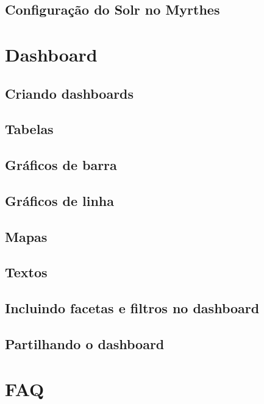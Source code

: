 \documentclass[]{book}
\begin{document}
\hypertarget{configuracao-do-solr-no-myrthes}{%
\section{Configuração do Solr no Myrthes}\label{configuracao-do-solr-no-myrthes}}

\hypertarget{dashbord}{%
\chapter{Dashboard}\label{dashbord}}

\hypertarget{criando-dashboards}{%
\section{Criando dashboards}\label{criando-dashboards}}

\hypertarget{tabelas}{%
\section{Tabelas}\label{tabelas}}

\hypertarget{graficos-de-barra}{%
\section{Gráficos de barra}\label{graficos-de-barra}}

\hypertarget{graficos-de-linha}{%
\section{Gráficos de linha}\label{graficos-de-linha}}

\hypertarget{mapas}{%
\section{Mapas}\label{mapas}}

\hypertarget{textos}{%
\section{Textos}\label{textos}}

\hypertarget{incluindo-facetas-e-filtros-no-dashboard}{%
\section{Incluindo facetas e filtros no dashboard}\label{incluindo-facetas-e-filtros-no-dashboard}}

\hypertarget{partilhando-o-dashboard}{%
\section{Partilhando o dashboard}\label{partilhando-o-dashboard}}

\hypertarget{faq}{%
\chapter{FAQ}\label{faq}}


\end{document}
